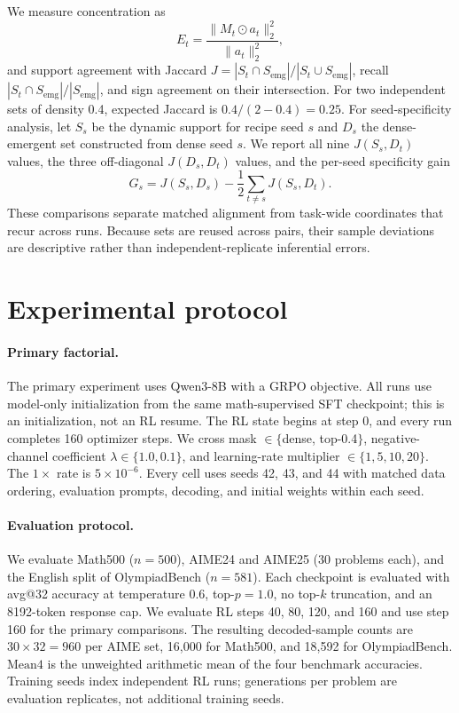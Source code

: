 \documentclass[5p,times]{elsarticle}
\newcommand{\Semg}{S_{\mathrm{emg}}}
\newcommand{\St}{S_t}
\newcommand{\MeanFour}{\mathrm{Mean4}}
\begin{document}
We measure concentration as
\begin{equation}
 E_t=\frac{\|M_t\odot a_t\|_2^2}{\|a_t\|_2^2},
\end{equation}
and support agreement with Jaccard
$J=|\St\cap\Semg|/|\St\cup\Semg|$, recall
$|\St\cap\Semg|/|\Semg|$, and sign agreement on their intersection. For two
independent sets of density 0.4, expected Jaccard is
$0.4/(2-0.4)=0.25$.
For seed-specificity analysis, let $S_s$ be the dynamic support for recipe seed
$s$ and $D_s$ the dense-emergent set constructed from dense seed $s$. We report
all nine $J(S_s,D_t)$ values, the three off-diagonal $J(D_s,D_t)$ values, and
the per-seed specificity gain
\begin{equation}
 G_s=J(S_s,D_s)-\frac{1}{2}\sum_{t\ne s}J(S_s,D_t).
 \label{eq:specificity}
\end{equation}
These comparisons separate matched alignment from task-wide coordinates that
recur across runs. Because sets are reused across pairs, their sample
deviations are descriptive rather than independent-replicate inferential
errors.

\section{Experimental protocol}\label{sec:protocol}
\paragraph{Primary factorial.}
The primary experiment uses Qwen3-8B with a GRPO objective. All runs use
model-only initialization from the same math-supervised SFT checkpoint; this
is an initialization, not an RL resume. The RL state begins at step 0, and
every run completes 160 optimizer steps.
We cross mask $\in\{$dense, top-0.4$\}$, negative-channel coefficient
$\lambda\in\{1.0,0.1\}$, and learning-rate multiplier
$\in\{1,5,10,20\}$. The $1\times$ rate is $5\times10^{-6}$. Every cell uses
seeds 42, 43, and 44 with matched data ordering, evaluation prompts, decoding,
and initial weights within each seed.

\paragraph{Evaluation protocol.}
We evaluate Math500 ($n=500$), AIME24 and
AIME25 (30 problems each), and the English split of OlympiadBench ($n=581$).
Each checkpoint is evaluated with avg@32 accuracy at temperature 0.6,
top-$p=1.0$, no top-$k$ truncation, and an 8192-token response cap. We evaluate
RL steps 40, 80, 120, and 160 and use step 160 for the primary comparisons.
The resulting decoded-sample counts are $30\times32=960$ per AIME set, 16,000
for Math500, and 18,592 for OlympiadBench.
$\MeanFour$ is the
unweighted arithmetic mean of the four benchmark accuracies. Training seeds
index independent RL runs; generations per problem are evaluation replicates,
not additional training seeds.
\end{document}
